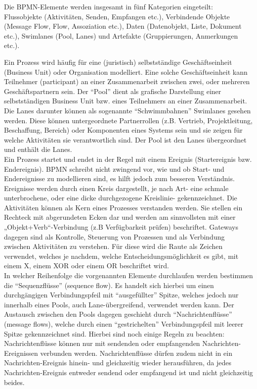 Die BPMN-Elemente werden insgesamt in fünf Kategorien eingeteilt: Flussobjekte
(Aktivitäten, Senden, Empfangen etc.), Verbindende Objekte 
(Message Flow, Flow, Assoziation etc.), Daten (Datenobjekt, Liste, Dokument etc.), 
Swimlanes (Pool, Lanes) und Artefakte (Gruppierungen, Anmerkungen etc.).

Ein Prozess wird häufig für eine (juristisch) selbstständige  Geschäftseinheit
(Business Unit) oder Organisation modelliert. Eine solche Geschäftseinheit 
kann Teilnehmer (participant) an einer Zusammenarbeit zwischen zwei, 
oder mehreren Geschäftspartnern sein. Der "`Pool"'  dient als grafische 
Darstellung einer selbstständigen Business Unit bzw. eines Teilnehmers 
an einer Zusammenarbeit. Die Lanes darunter können als sogenannte "`Schwimmbahnen"'
Swimlanes gesehen werden. Diese können untergeordnete Partnerrollen 
(z.B. Vertrieb, Projektleitung, Beschaffung, Bereich) oder Komponenten 
eines Systems sein und sie zeigen für welche Aktivitäten sie verantwortlich sind. 
Der Pool ist den Lanes übergeordnet und enthält die Lanes.\\

Ein Prozess startet und endet in der Regel mit einem Ereignis (Startereignis
bzw. Endereignis). BPMN schreibt nicht zwingend vor, wie und ob Start- 
und Endereignisse zu modellieren sind, es hilft jedoch zum besseren Verständnis. 
Ereignisse werden durch einen Kreis dargestellt, je nach Art- eine schmale 
unterbrochene, oder eine dicke durchgezogene Kreislinie- gekennzeichnet. 
Die Aktivitäten können als Kern eines Prozesses verstanden werden. 
Sie stellen ein Rechteck mit abgerundeten Ecken dar und werden am 
sinnvollsten mit einer „Objekt+Verb“-Verbindung (z.B Verfügbarkeit prüfen) 
beschriftet. Gateways dagegen sind als Kontrolle, Steuerung von Prozessen 
und als Verbindung zwischen Aktivitäten zu verstehen. Für diese wird die 
Raute als Zeichen verwendet, welches je nachdem, welche Entscheidungsmöglichkeit 
es gibt, mit einem X, einem XOR oder einem OR beschriftet wird.\\

In welcher Reihenfolge die vorgenannten Elemente durchlaufen werden bestimmen
die "`Sequenzflüsse"' (sequence flow). Es handelt sich hierbei um einen 
durchgängigen Verbindungspfeil mit "`ausgefüllter"' Spitze, welches jedoch nur 
innerhalb eines Pools, auch Lane-übergreifend, verwendet werden kann. 
Der Austausch zwischen den Pools dagegen geschieht durch "`Nachrichtenflüsse"' (message flows),
 welche durch einen "`gestrichelten"' Verbindungspfeil mit leerer Spitze gekennzeichnet 
 sind. Hierbei sind noch einige Regeln zu beachten: Nachrichtenflüsse können nur mit 
 sendenden oder empfangenden Nachrichten-Ereignissen verbunden werden. 
 Nachrichtenflüsse dürfen zudem nicht in ein Nachrichten-Ereignis hinein- und 
 gleichzeitig wieder herausführen, da jedes Nachrichten-Ereignis entweder sendend 
 oder empfangend ist und nicht gleichzeitig beides.\\


